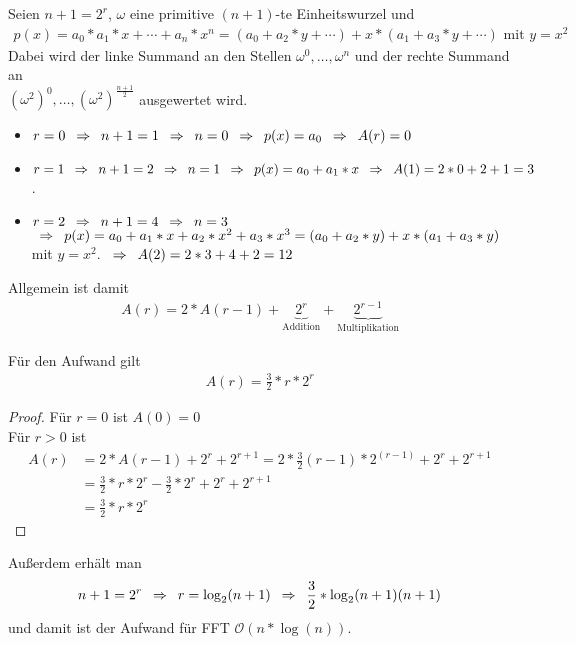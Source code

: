 \begin{satz}
	Seien $n+1 = 2^r$, $\omega$ eine primitive $(n+1)$-te Einheitswurzel und
	\begin{align*}
		p(x) = a_0 * a_1 * x + \cdots + a_n * x^n = (a_0 + a_2 * y + \cdots) + x*(a_1 + a_3 * y + \cdots) \text{ mit } y = x^2
	\end{align*}
	Dabei wird der linke Summand an den Stellen $\omega^0, \dots, \omega^n$ und der rechte Summand an \\
	$(\omega^2)^0, \dots, (\omega^2)^{\frac{n+1}{2}}$ ausgewertet wird.
\end{satz}
\begin{bsp}
	\begin{itemize}
		\item $r=0 \enspace \Rightarrow \enspace n+1 = 1 \enspace \Rightarrow \enspace n = 0 \enspace \Rightarrow \enspace p(x) = a_0 \enspace \Rightarrow \enspace A(r) = 0$
		\item $r=1 \enspace \Rightarrow \enspace n+1 = 2 \enspace \Rightarrow \enspace n = 1 \enspace \Rightarrow \enspace p(x) = a_0 + a_1 * x \enspace \Rightarrow \enspace A(1) = 2*0 + 2 +1 = 3$. \\
		\item $r=2 \enspace \Rightarrow \enspace n+1 = 4 \enspace \Rightarrow \enspace n = 3$ \\
		$\enspace \Rightarrow \enspace p(x) = a_0 + a_1 * x + a_2 * x^2 + a_3 * x^3 = (a_0 + a_2 * y) + x * (a_1 + a_3 * y)$ mit $y=x^2$.
		$\enspace \Rightarrow \enspace A(2) = 2*3 + 4 + 2 = 12$
	\end{itemize}
	Allgemein ist damit
	\begin{align*}
		A(r) = 2 * A(r-1) + \underbrace{2^r}_{\text{Addition}} + \underbrace{2^{r-1}}_{\text{Multiplikation}}
	\end{align*}
\end{bsp}
\begin{satz}
	Für den Aufwand gilt
	\begin{align*}
		A(r) = \frac{3}{2} * r * 2^r
	\end{align*}
\end{satz}
\begin{proof}
	Für $r=0$ ist $A(0) = 0$ \checkmark \\
	Für $r>0$ ist 
	\begin{align*}
		A(r) 
		&= 2 * A(r-1) + 2^r + 2^{r+1} = 2 * \frac{3}{2} (r-1) *2^(r-1) + 2^r + 2^{r+1} \\
		&= \frac{3}{2} * r * 2^r - \frac{3}{2} * 2^r + 2^r + 2^{r+1} \\
		&= \frac{3}{2} * r * 2^r
	\end{align*}
\end{proof}

\begin{bem}
	Außerdem erhält man
	\begin{align*}
		n+1 = 2^r \enspace \Rightarrow \enspace r = \log_2(n+1) \enspace \Rightarrow \enspace \frac{3}{2} * \log_2(n+1) (n+1)
	\end{align*} 
	und damit ist der Aufwand für FFT $\mathcal{O}(n * \log(n))$.
\end{bem}
